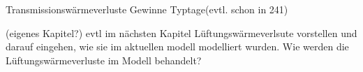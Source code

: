

Transmissionswärmeverluste
Gewinne
Typtage(evtl. schon in 241)



(eigenes Kapitel?) evtl im nächsten Kapitel Lüftungswärmeverlsute vorstellen und darauf eingehen, wie sie im aktuellen modell modelliert wurden.
Wie werden die Lüftungswärmeverluste im Modell behandelt?
















%

